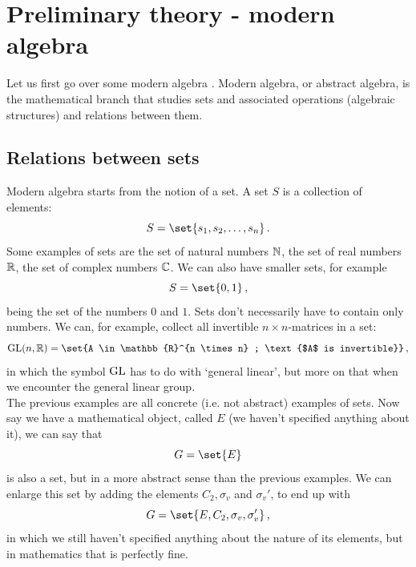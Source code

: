 \section{Preliminary theory - modern algebra}

    Let us first go over some modern algebra \cite{joyce2008}. Modern algebra, or abstract algebra, is the mathematical branch that studies sets and associated operations (algebraic structures) and relations between them.

    \subsection{Relations between sets}
        Modern algebra starts from the notion of a set. A set $S$ is a collection of elements:
        \begin{equation}
            S = \set{s_1, s_2, \dots, s_n} \thinspace .
        \end{equation}
        Some examples of sets are the set of natural numbers $\mathbb{N}$, the set of real numbers $\mathbb{R}$, the set of complex numbers $\mathbb{C}$. We can also have smaller sets, for example
        \begin{equation}
            S = \set{0, 1} \thinspace ,
        \end{equation}
        being the set of the numbers $0$ and $1$. Sets don't necessarily have to contain only numbers. We can, for example, collect all invertible $n \times n$-matrices in a set:
        \begin{equation}
            \GLg(n, \mathbb{R}) = \set{A \in \mathbb{R}^{n \times n} ; \text{$A$ is invertible}} \thinspace ,
        \end{equation}
        in which the symbol $\operatorname{GL}$ has to do with `general linear', but more on that when we encounter the general linear group. \\

        The previous examples are all concrete (i.e. not abstract) examples of sets. Now say we have a mathematical object, called $E$ (we haven't specified anything about it), we can say that
        \begin{equation}
            G = \set{E}
        \end{equation}
        is also a set, but in a more abstract sense than the previous examples. We can enlarge this set by adding the elements $C_2, \sigma_v$ and $\sigma_v'$, to end up with
        \begin{equation}
            G = \set{E, C_2, \sigma_v, \sigma_v'} \thinspace ,
        \end{equation}
        in which we still haven't specified anything about the nature of its elements, but in mathematics that is perfectly fine. \\

